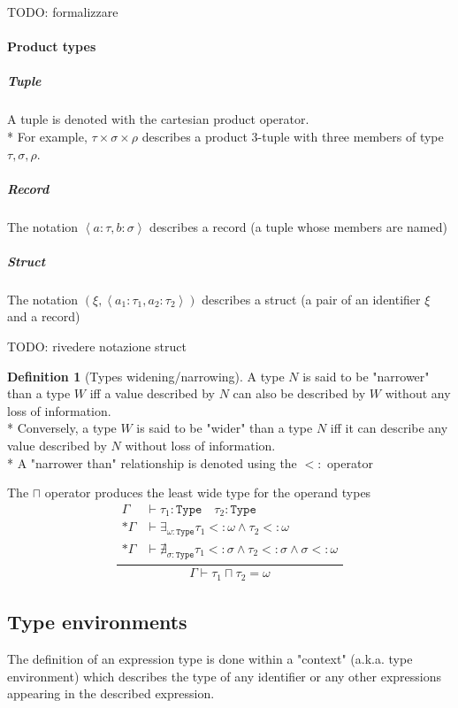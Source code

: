 \documentclass[11pt]{report}
\newcommand{\infrule}[3][gathered]{\frac{\begin{#1}#2\end{#1}}{\begin{gathered}#3\end{gathered}}}
\newcommand{\then}{\vdash}
\newcommand{\tuple}[1]{\left<#1\right>}
\newcommand{\narr}{<:}
\newcommand{\Type}{\texttt{Type}}
\newcommand{\Env}{\Gamma}
\theoremstyle{definition}
\newtheorem{definition}{Definition}[section]
\newcommand{\comment}[1]{
	\parbox{0.9\linewidth}{\color{black!30}\small\sffamily #1}
}
\begin{document}
\comment{TODO: formalizzare}

\paragraph{Product types}

\subparagraph{Tuple} A tuple is denoted with the cartesian product operator.\\*
For example, $\tau \times \sigma \times \rho$ describes a product 3-tuple with
three members of type $\tau, \sigma, \rho$.

\subparagraph{Record} The notation $\tuple{a:\tau, b:\sigma}$ describes a
record (a tuple whose members are named)

\subparagraph{Struct} The notation $(\xi, \tuple{a_1:\tau_1, a_2:\tau_2})$
describes a struct (a pair of an identifier $\xi$ and a record)

\comment{TODO: rivedere notazione struct}

\begin{definition}[Types widening/narrowing]
	A type $N$ is said to be "narrower" than a type $W$ iff a value described
	by $N$ can also be described by $W$ without any loss of information.\\*
	Conversely, a type $W$ is said to be "wider" than a type $N$ iff it can
	describe any value described by $N$ without loss of information.\\*
	A "narrower than" relationship is denoted using the $\narr$ operator 
\end{definition}

The $\sqcap$ operator produces the least wide type for the operand types
\[
	\infrule[aligned]{
		\Env & \then \tau_1:\Type \quad \tau_2:\Type \\*
		\Env & \then \exists_{\omega:\Type}{\tau_1\narr\omega \land \tau_2\narr\omega} \\*
		\Env & \then \nexists_{\sigma:\Type}{\tau_1\narr\sigma \land \tau_2\narr\sigma \land \sigma\narr\omega}
	}{
		\Env\then \tau_1 \sqcap \tau_2 = \omega
	}
\]

\newpage

\subsection{Type environments}

The definition of an expression type is done within a "context" (a.k.a. type
environment) which describes the type of any identifier or any other
expressions appearing in the described expression.
\end{document}

